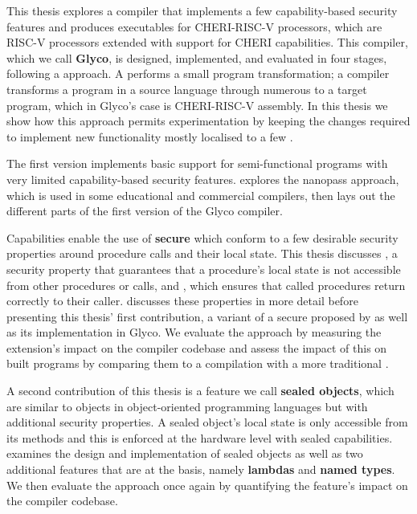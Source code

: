 \documentclass[main.tex]{subfiles}
\begin{document}
This thesis explores a compiler that implements a few capability-based security features and produces executables for CHERI-RISC-V processors, which are RISC-V processors extended with support for CHERI capabilities. This compiler, which we call \textbf{Glyco}, is designed, implemented, and evaluated in four stages, following a  approach. A  performs a small program transformation; a  compiler transforms a program in a source language through numerous  to a target program, which in Glyco's case is CHERI-RISC-V assembly. In this thesis we show how this approach permits experimentation by keeping the changes required to implement new functionality mostly localised to a few .

The first version implements basic support for semi-functional programs with very limited capability-based security features.  explores the nanopass approach, which is used in some educational and commercial compilers, then lays out the different parts of the first version of the Glyco compiler.

Capabilities enable the use of \textbf{secure } which conform to a few desirable security properties around procedure calls and their local state. This thesis discusses \emph{}, a security property that guarantees that a procedure's local state is not accessible from other procedures or calls, and \emph{}, which ensures that called procedures return correctly to their caller.  discusses these properties in more detail before presenting this thesis' first contribution, a variant of a secure  proposed by \citet{cerise} as well as its implementation in Glyco. We evaluate the  approach by measuring the extension's impact on the compiler codebase and assess the impact of this  on built programs by comparing them to a compilation with a more traditional .

A second contribution of this thesis is a feature we call \textbf{sealed objects}, which are similar to objects in object-oriented programming languages but with additional security properties. A sealed object's local state is only accessible from its methods and this is enforced at the hardware level with sealed capabilities.  examines the design and implementation of sealed objects as well as two additional features that are at the basis, namely \textbf{lambdas} and \textbf{named types}. We then evaluate the  approach once again by quantifying the feature's impact on the compiler codebase.
\end{document}
